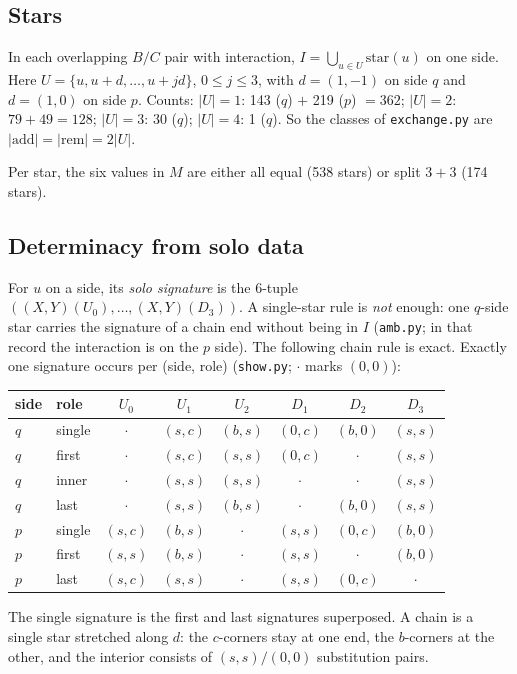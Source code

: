 \documentclass[11pt]{article}
\theoremstyle{definition}\newtheorem{definition}[theorem]{Definition}\newtheorem{remark}[theorem]{Remark}
\begin{document}
\subsection{Stars}
\begin{lemma}[computed, 521/521]\label{lem:stars}
In each overlapping $B/C$ pair with interaction, $I=\bigcup_{u\in U}\mathrm{star}(u)$ on one side. Here $U=\{u,u+d,\dots,u+jd\}$, $0\le j\le 3$,
with $d=(1,-1)$ on side $q$ and $d=(1,0)$ on side $p$. Counts: $|U|=1$: 143 ($q$) $+$ 219 ($p$) $=362$; $|U|=2$: $79+49=128$; $|U|=3$: 30 ($q$); $|U|=4$: 1 ($q$).
So the classes of \texttt{exchange.py} are $|\mathrm{add}|=|\mathrm{rem}|=2|U|$.
\end{lemma}
Per star, the six values in $M$ are either all equal (538 stars) or split $3+3$ (174 stars).

\subsection{Determinacy from solo data}
For $u$ on a side, its \emph{solo signature} is the 6-tuple $((X,Y)(U_0),\dots,(X,Y)(D_3))$. A single-star rule is \emph{not} enough: one $q$-side star
carries the signature of a chain end without being in $I$ (\texttt{amb.py}; in that record the interaction is on the $p$ side). The following chain rule is exact.
Exactly one signature occurs per (side, role) (\texttt{show.py}; $\cdot$ marks $(0,0)$):
\begin{center}\small\begin{tabular}{llcccccc}\toprule
side & role & $U_0$ & $U_1$ & $U_2$ & $D_1$ & $D_2$ & $D_3$\\\midrule
$q$ & single & $\cdot$ & $(s,c)$ & $(b,s)$ & $(0,c)$ & $(b,0)$ & $(s,s)$\\
$q$ & first & $\cdot$ & $(s,c)$ & $(s,s)$ & $(0,c)$ & $\cdot$ & $(s,s)$\\
$q$ & inner & $\cdot$ & $(s,s)$ & $(s,s)$ & $\cdot$ & $\cdot$ & $(s,s)$\\
$q$ & last & $\cdot$ & $(s,s)$ & $(b,s)$ & $\cdot$ & $(b,0)$ & $(s,s)$\\\midrule
$p$ & single & $(s,c)$ & $(b,s)$ & $\cdot$ & $(s,s)$ & $(0,c)$ & $(b,0)$\\
$p$ & first & $(s,s)$ & $(b,s)$ & $\cdot$ & $(s,s)$ & $\cdot$ & $(b,0)$\\
$p$ & last & $(s,c)$ & $(s,s)$ & $\cdot$ & $(s,s)$ & $(0,c)$ & $\cdot$\\\bottomrule
\end{tabular}\end{center}
The single signature is the first and last signatures superposed. A chain is a single star stretched along $d$: the $c$-corners stay at one end,
the $b$-corners at the other, and the interior consists of $(s,s)/(0,0)$ substitution pairs.
\end{document}
